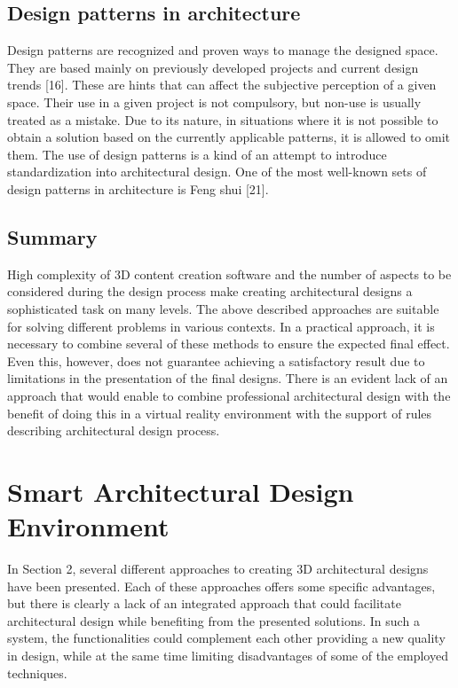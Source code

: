 \documentclass[runningheads]{llncs}
\begin{document}
\subsection{Design patterns in architecture}
Design patterns are recognized and proven ways to manage the designed space. They are based mainly on previously developed projects and current design trends [16]. These are hints that can affect the subjective perception of a given space. Their use in a given project is not compulsory, but non-use is usually treated as a mistake. Due to its nature, in situations where it is not possible to obtain a solution based on the currently applicable patterns, it is allowed to omit them. The use of design patterns is a kind of an attempt to introduce standardization into architectural design. One of the most well-known sets of design patterns in architecture is Feng shui [21].

\subsection{Summary}
High complexity of 3D content creation software and the number of aspects to be considered during the design process make creating architectural designs a sophisticated task on many levels. The above described approaches are suitable for solving different problems in various contexts. In a practical approach, it is necessary to combine several of these methods to ensure the expected final effect. Even this, however, does not guarantee achieving a satisfactory result due to limitations in the presentation of the final designs.
There is an evident lack of an approach that would enable to combine professional architectural design with the benefit of doing this in a virtual reality environment with the support of rules describing architectural design process.

\section{Smart Architectural Design Environment}

In Section 2, several different approaches to creating 3D architectural designs have been presented. Each of these approaches offers some specific advantages, but there is clearly a lack of an integrated approach that could facilitate architectural design while benefiting from the presented solutions. In such a system, the functionalities could complement each other providing a new quality in design, while at the same time limiting disadvantages of some of the employed techniques.
\end{document}
